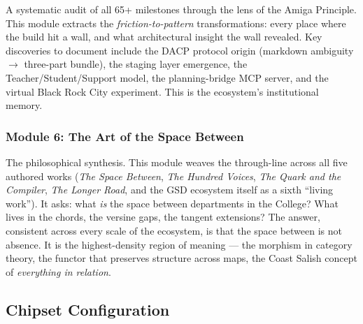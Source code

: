 \documentclass[11pt,letterpaper]{article}
\begin{document}
A systematic audit of all 65+ milestones through the lens of the Amiga Principle. This module
extracts the \textit{friction-to-pattern} transformations: every place where the build hit a
wall, and what architectural insight the wall revealed. Key discoveries to document include the
DACP protocol origin (markdown ambiguity $\to$ three-part bundle), the staging layer emergence,
the Teacher/Student/Support model, the planning-bridge MCP server, and the virtual Black Rock
City experiment. This is the ecosystem's institutional memory.

\subsubsection{Module 6: The Art of the Space Between}

The philosophical synthesis. This module weaves the through-line across all five authored works
(\textit{The Space Between}, \textit{The Hundred Voices}, \textit{The Quark and the Compiler},
\textit{The Longer Road}, and the GSD ecosystem itself as a sixth ``living work''). It asks: what
\textit{is} the space between departments in the College? What lives in the chords, the versine
gaps, the tangent extensions? The answer, consistent across every scale of the ecosystem, is that
the space between is not absence. It is the highest-density region of meaning --- the morphism in
category theory, the functor that preserves structure across maps, the Coast Salish concept of
\textit{everything in relation}.

\subsection{Chipset Configuration}
\end{document}
